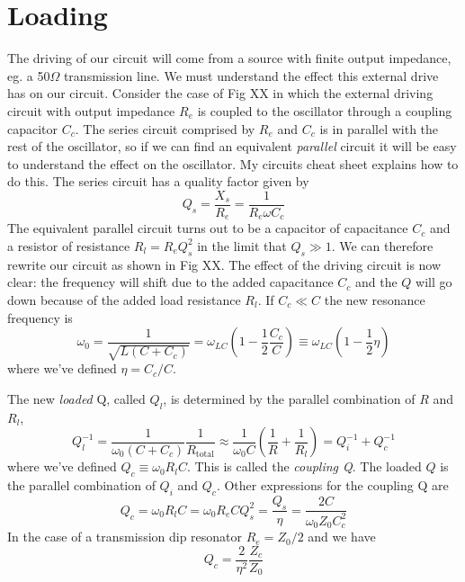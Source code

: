 \documentclass{article}
\begin{document}
\section{Loading}

The driving of our circuit will come from a source with finite output impedance, eg. a 50$\Omega$ transmission line. We must understand the effect this external drive has on our circuit. Consider the case of Fig XX in which the external driving circuit with output impedance $R_e$ is coupled to the oscillator through a coupling capacitor $C_c$. The series circuit comprised by $R_e$ and $C_c$ is in parallel with the rest of the oscillator, so if we can find an equivalent \emph{parallel} circuit it will be easy to understand the effect on the oscillator. My circuits cheat sheet explains how to do this. The series circuit has a quality factor given by \begin{equation}
Q_s = \frac{X_s}{R_e} = \frac{1}{R_e \omega C_c} \end{equation}
The equivalent parallel circuit turns out to be a capacitor of capacitance $C_c$ and a resistor of resistance $R_l = R_e Q_s^2$ in the limit that $Q_s \gg 1$. We can therefore rewrite our circuit as shown in Fig XX. The effect of the driving circuit is now clear: the frequency will shift due to the added capacitance $C_c$ and the $Q$ will go down because of the added load resistance $R_l$. If $C_c \ll C$ the new resonance frequency is \begin{equation}
\omega_0 = \frac{1}{\sqrt{L(C + C_c)}} =\omega_{LC} \left( 1 - \frac{1}{2}\frac{C_c}{C} \right) \equiv \omega_{LC} \left( 1 - \frac{1}{2}\eta \right) \end{equation}
where we've defined $\eta = C_c/C$. 


The new \emph{loaded} Q, called $Q_l$, is determined by the parallel combination of $R$ and $R_l$, \begin{equation}
Q_l^{-1} = \frac{1}{\omega_0(C+C_c)} \frac{1}{R_{\textrm{total}}} \approx \frac{1}{\omega_0 C} \left( \frac{1}{R}+ \frac{1}{R_l} \right) = Q_i^{-1} + Q_c^{-1} \end{equation}
where we've defined $Q_c \equiv \omega_0 R_l C$. This is called the \emph{coupling Q}. The loaded $Q$ is the parallel combination of $Q_i$ and $Q_c$. Other expressions for the coupling Q are \begin{equation}
Q_c = \omega_0 R_l C = \omega_0 R_e C Q_s^2 = \frac{Q_s}{\eta} = \frac{2C}{\omega_0 Z_0 C_c^2}\end{equation}
In the case of a transmission dip resonator $R_e = Z_0/2$ and we have \begin{equation}
Q_c = \frac{2}{\eta^2}\frac{Z_c}{Z_0} \end{equation}
\end{document}
